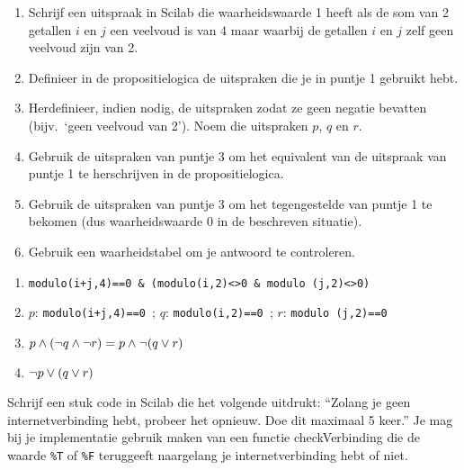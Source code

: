 \begin{oef}
\begin{enumerate}

 \item Schrijf een uitspraak in Scilab die waarheidswaarde 1 heeft als de som van 2 getallen $i$ en $j$ een veelvoud is van 4 maar waarbij de getallen $i$ en $j$ zelf geen veelvoud zijn van 2.
 \item Definieer	 in	de	propositielogica	de 	uitspraken	die	je	in	puntje	1 gebruikt	hebt.
\item Herdefinieer,	indien	nodig,	de	 uitspraken	zodat	ze	 geen	negatie 	bevatten	(bijv.\ `geen	veelvoud	van	2'). Noem die uitspraken $p$, $q$ en $r$.
\item Gebruik	de 	uitspraken	van	puntje	3	om	het	equivalent	van	de uitspraak	van	
puntje	1	te	herschrijven in	de 	propositielogica.
\item Gebruik	de	 uitspraken	van	puntje	3	om	het	tegengestelde	van	puntje	1	te	
bekomen	(dus	waarheidswaarde	0	in	de 	beschreven	situatie).
\item Gebruik	een	waarheidstabel	om	je	antwoord	te	controleren.


\end{enumerate}

\begin{opl}
\begin{enumerate}
\item \verb/modulo(i+j,4)==0 & (modulo(i,2)<>0 & modulo (j,2)<>0)/
\item $p$: \verb/modulo(i+j,4)==0 /; $q$: \verb/modulo(i,2)==0 /; $r$: \verb/modulo (j,2)==0/
\item $p \wedge (\neg q \wedge \neg r)=p\wedge \neg (q \vee r)$
\item $\neg p \vee (q \vee r)$
\end{enumerate}
\end{opl}
\end{oef}

\begin{oef}
 Schrijf een stuk code in Scilab die het volgende uitdrukt: “Zolang je geen internetverbinding hebt, probeer het opnieuw. Doe dit maximaal 5 keer.” Je mag bij je implementatie gebruik maken van een functie checkVerbinding die de waarde \verb+%T+ of \verb+%F+ teruggeeft naargelang je internetverbinding hebt of niet.

\end{oef}

